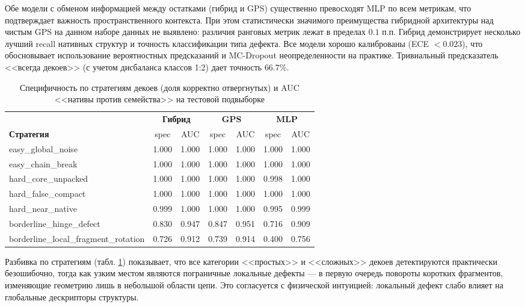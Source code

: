 \documentclass[12pt, a4paper]{article}
\begin{document}
Обе модели с обменом информацией между остатками (гибрид и GPS) существенно превосходят MLP по всем метрикам, что подтверждает важность пространственного контекста. При этом статистически значимого преимущества гибридной архитектуры над чистым GPS на данном наборе данных не выявлено: различия ранговых метрик лежат в пределах $0.1$ п.п. Гибрид демонстрирует несколько лучший recall нативных структур и точность классификации типа дефекта. Все модели хорошо калиброваны (ECE $< 0.023$), что обосновывает использование вероятностных предсказаний и MC-Dropout неопределенности на практике. Тривиальный предсказатель <<всегда декоев>> (с учетом дисбаланса классов 1:2) дает точность $66.7\%$.

\begin{table}[h]
\centering
\caption{Специфичность по стратегиям декоев (доля корректно отвергнутых) и AUC <<нативы против семейства>> на тестовой подвыборке}
\label{tab:per_strategy}
\begin{tabular}{lcccccc}
\toprule
 & \multicolumn{2}{c}{\textbf{Гибрид}} & \multicolumn{2}{c}{\textbf{GPS}} & \multicolumn{2}{c}{\textbf{MLP}} \\
\cmidrule(lr){2-3} \cmidrule(lr){4-5} \cmidrule(lr){6-7}
\textbf{Стратегия} & spec & AUC & spec & AUC & spec & AUC \\
\midrule
easy\_global\_noise & 1.000 & 1.000 & 1.000 & 1.000 & 1.000 & 1.000 \\
easy\_chain\_break & 1.000 & 1.000 & 1.000 & 1.000 & 1.000 & 1.000 \\
hard\_core\_unpacked & 1.000 & 1.000 & 1.000 & 1.000 & 0.998 & 1.000 \\
hard\_false\_compact & 1.000 & 1.000 & 1.000 & 1.000 & 1.000 & 1.000 \\
hard\_near\_native & 0.999 & 1.000 & 1.000 & 1.000 & 0.995 & 0.999 \\
borderline\_hinge\_defect & 0.830 & 0.947 & 0.847 & 0.951 & 0.716 & 0.909 \\
borderline\_local\_fragment\_rotation & 0.726 & 0.912 & 0.739 & 0.914 & 0.400 & 0.756 \\
\bottomrule
\end{tabular}
\end{table}

Разбивка по стратегиям (табл. \ref{tab:per_strategy}) показывает, что все категории <<простых>> и <<сложных>> декоев детектируются практически безошибочно, тогда как узким местом являются пограничные локальные дефекты --- в первую очередь повороты коротких фрагментов, изменяющие геометрию лишь в небольшой области цепи. Это согласуется с физической интуицией: локальный дефект слабо влияет на глобальные дескрипторы структуры.
\end{document}
